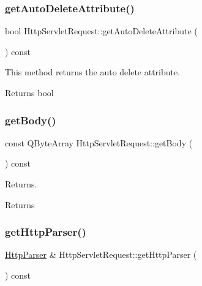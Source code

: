 \subsubsection{\texorpdfstring{get\+Auto\+Delete\+Attribute()}{getAutoDeleteAttribute()}}
{\footnotesize\ttfamily bool Http\+Servlet\+Request\+::get\+Auto\+Delete\+Attribute (\begin{DoxyParamCaption}{ }\end{DoxyParamCaption}) const}



This method returns the auto delete attribute. 

\begin{DoxyReturn}{Returns}
bool 
\end{DoxyReturn}
\mbox{\label{class_http_servlet_request_a94c089ed1819811cd02bd0c69f3546ca}} 
\subsubsection{\texorpdfstring{get\+Body()}{getBody()}}
{\footnotesize\ttfamily const Q\+Byte\+Array Http\+Servlet\+Request\+::get\+Body (\begin{DoxyParamCaption}{ }\end{DoxyParamCaption}) const}



Returns. 

\begin{DoxyReturn}{Returns}

\end{DoxyReturn}
\mbox{\label{class_http_servlet_request_a26064824e0d709ee032b889147acd579}} 
\subsubsection{\texorpdfstring{get\+Http\+Parser()}{getHttpParser()}}
{\footnotesize\ttfamily \hyperlink{class_http_parser}{Http\+Parser} \& Http\+Servlet\+Request\+::get\+Http\+Parser (\begin{DoxyParamCaption}{ }\end{DoxyParamCaption}) const}



